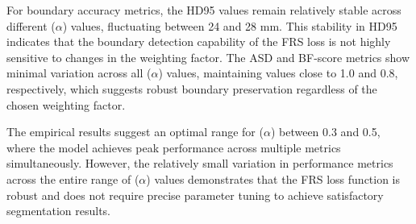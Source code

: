 \documentclass[review]{elsarticle}
\begin{document}
For boundary accuracy metrics, the HD95 values remain relatively stable across different (\(\alpha\)) values, fluctuating between 24 and 28 mm. This stability in HD95 indicates that the boundary detection capability of the FRS loss is not highly sensitive to changes in the weighting factor. The ASD and BF-score metrics show minimal variation across all (\(\alpha\)) values, maintaining values close to 1.0 and 0.8, respectively, which suggests robust boundary preservation regardless of the chosen weighting factor.

The empirical results suggest an optimal range for (\(\alpha\)) between 0.3 and 0.5, where the model achieves peak performance across multiple metrics simultaneously. However, the relatively small variation in performance metrics across the entire range of (\(\alpha\)) values demonstrates that the FRS loss function is robust and does not require precise parameter tuning to achieve satisfactory segmentation results.
\end{document}
